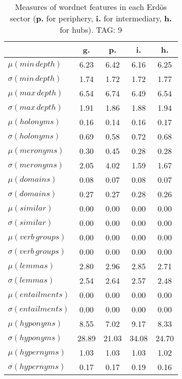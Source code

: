 \begin{table}[h!]
\begin{center}
\begin{tabular}{| l | c | c | c | c |}\hline
 & g. & p. & i. & h. \\\hline
$\mu(min\,depth)$ & 6.23  & 6.42  & 6.16  & 6.25 \\\hline
$\sigma(min\,depth)$ & 1.74  & 1.72  & 1.72  & 1.77 \\\hline
$\mu(max\,depth)$ & 6.54  & 6.74  & 6.49  & 6.54 \\\hline
$\sigma(max\,depth)$ & 1.91  & 1.86  & 1.88  & 1.94 \\\hline
$\mu(holonyms)$ & 0.16  & 0.14  & 0.16  & 0.17 \\\hline
$\sigma(holonyms)$ & 0.69  & 0.58  & 0.72  & 0.68 \\\hline
$\mu(meronyms)$ & 0.30  & 0.45  & 0.28  & 0.28 \\\hline
$\sigma(meronyms)$ & 2.05  & 4.02  & 1.59  & 1.67 \\\hline
$\mu(domains)$ & 0.08  & 0.07  & 0.08  & 0.07 \\\hline
$\sigma(domains)$ & 0.27  & 0.27  & 0.28  & 0.26 \\\hline
$\mu(similar)$ & 0.00  & 0.00  & 0.00  & 0.00 \\\hline
$\sigma(similar)$ & 0.00  & 0.00  & 0.00  & 0.00 \\\hline
$\mu(verb\,groups)$ & 0.00  & 0.00  & 0.00  & 0.00 \\\hline
$\sigma(verb\,groups)$ & 0.00  & 0.00  & 0.00  & 0.00 \\\hline
$\mu(lemmas)$ & 2.80  & 2.96  & 2.85  & 2.71 \\\hline
$\sigma(lemmas)$ & 2.54  & 2.64  & 2.57  & 2.48 \\\hline
$\mu(entailments)$ & 0.00  & 0.00  & 0.00  & 0.00 \\\hline
$\sigma(entailments)$ & 0.00  & 0.00  & 0.00  & 0.00 \\\hline
$\mu(hyponyms)$ & 8.55  & 7.02  & 9.17  & 8.33 \\\hline
$\sigma(hyponyms)$ & 28.89  & 21.03  & 34.08  & 24.70 \\\hline
$\mu(hypernyms)$ & 1.03  & 1.03  & 1.03  & 1.02 \\\hline
$\sigma(hypernyms)$ & 0.17  & 0.17  & 0.19  & 0.16 \\\hline
\end{tabular}
\caption{Measures of wordnet features in each Erd\"os sector ({{\bf p.}} for periphery, {{\bf i.}} for intermediary, {{\bf h.}} for hubs). TAG: 9}
\end{center}
\end{table}